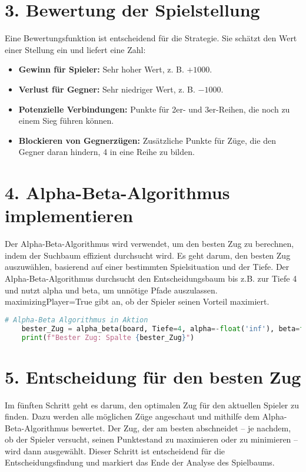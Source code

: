 \section*{3. Bewertung der Spielstellung}

Eine Bewertungsfunktion ist entscheidend für die Strategie. Sie schätzt den Wert einer Stellung ein und liefert eine Zahl:

\begin{itemize}
	\item \textbf{Gewinn für Spieler:} Sehr hoher Wert, z. B. \( +1000 \).
	\item \textbf{Verlust für Gegner:} Sehr niedriger Wert, z. B. \( -1000 \).
	\item \textbf{Potenzielle Verbindungen:} Punkte für 2er- und 3er-Reihen, die noch zu einem Sieg führen können.
	\item \textbf{Blockieren von Gegnerzügen:} Zusätzliche Punkte für Züge, die den Gegner daran hindern, 4 in eine Reihe zu bilden.
\end{itemize}

\section*{4. Alpha-Beta-Algorithmus implementieren}
	Der Alpha-Beta-Algorithmus wird verwendet, um den besten Zug zu berechnen, indem der Suchbaum effizient durchsucht wird. 
    Es geht darum, den besten Zug auszuwählen, basierend auf einer bestimmten Spielsituation und der Tiefe. Der Alpha-Beta-Algorithmus durchsucht den Entscheidungsbaum bis z.B. zur Tiefe 4 und nutzt alpha und beta, um unnötige Pfade auszulassen. maximizingPlayer=True gibt an, ob der Spieler seinen Vorteil maximiert.
\begin{lstlisting}[language=Python, caption=Alpha-Beta Algorithmus - Überblick]
	# Alpha-Beta Algorithmus in Aktion
	bester_Zug = alpha_beta(board, Tiefe=4, alpha=-float('inf'), beta=float('inf'), maximizingPlayer=True)
	print(f"Bester Zug: Spalte {bester_Zug}")
\end{lstlisting}

\section*{5. Entscheidung für den besten Zug}

Im fünften Schritt geht es darum, den optimalen Zug für den aktuellen Spieler zu finden. Dazu werden alle möglichen Züge angeschaut und mithilfe dem Alpha-Beta-Algorithmus bewertet. Der Zug, der am besten abschneidet – je nachdem, ob der Spieler versucht, seinen Punktestand zu maximieren oder zu minimieren – wird dann ausgewählt. Dieser Schritt ist entscheidend für die Entscheidungsfindung und markiert das Ende der Analyse des Spielbaums.

